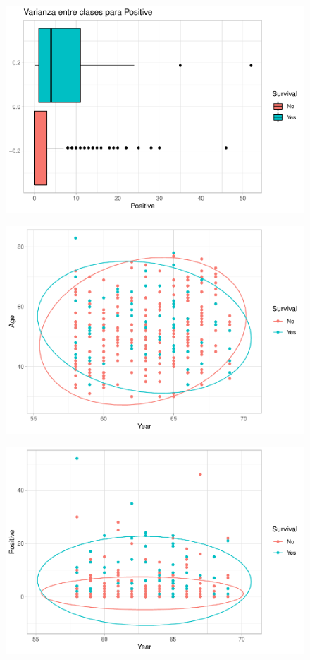 \begin{figure}[H]\center\includegraphics[width=.8\linewidth]{img/Clasificacion_files/figure-latex/unnamed-chunk-19-3}\caption{}\end{figure}

\begin{figure}[H]\center\includegraphics[width=.8\linewidth]{img/Clasificacion_files/figure-latex/unnamed-chunk-20-1}\caption{}\end{figure}

\begin{figure}[H]\center\includegraphics[width=.8\linewidth]{img/Clasificacion_files/figure-latex/unnamed-chunk-20-2}\caption{}\end{figure}


